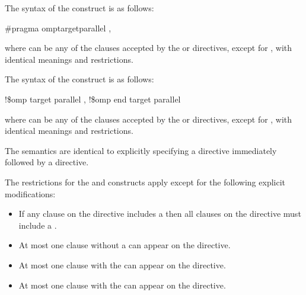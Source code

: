 {{{{\syntax
\ccppspecificstart
The syntax of the   construct is as follows:

\begin{boxedcode}
\#pragma omp\plc{ }target\plc{ }parallel \plc{[clause[ [},\plc{] clause] ... ] new-line}
\end{boxedcode}

where  can be any of the clauses accepted by the  or
 directives, except for , with identical meanings and restrictions.
\ccppspecificend

\pagebreak

\begin{samepage}
\fortranspecificstart
The syntax of the   construct is as follows:

\begin{boxedcode}
!\$omp target parallel \plc{[clause[ [},\plc{] clause] ... ]}
!\$omp end target parallel
\end{boxedcode}
\end{samepage}

where  can be any of the clauses accepted by the  or 
 directives, except for , with identical meanings and restrictions.
\fortranspecificend

\descr
The semantics are identical to explicitly specifying a  directive 
immediately followed by a  directive. 

\restrictions

The restrictions for the  and  constructs apply except for the following explicit modifications:

\begin{itemize}
\item If any  clause on the directive includes a
       then all  clauses 
      on the directive must include a .

\item At most one  clause without a 
       can appear on the directive.

\item At most one  clause with the  
       can appear on the directive.


\item At most one  clause with the  
       can appear on the directive.
\end{itemize}

}}}}
